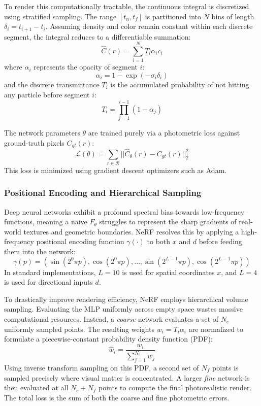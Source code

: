 To render this computationally tractable, the continuous integral is discretized using stratified sampling. The range $[t_n, t_f]$ is partitioned into $N$ bins of length $\delta_i = t_{i+1} - t_i$. Assuming density and color remain constant within each discrete segment, the integral reduces to a differentiable summation:
\begin{equation}
\hat{C}(r) = \sum_{i=1}^N T_i \alpha_i c_i
\end{equation}
where $\alpha_i$ represents the opacity of segment $i$:
\begin{equation}
\alpha_i = 1 - \exp(-\sigma_i \delta_i)
\end{equation}
and the discrete transmittance $T_i$ is the accumulated probability of not hitting any particle before segment $i$:
\begin{equation}
T_i = \prod_{j=1}^{i-1} (1 - \alpha_j)
\end{equation}

The network parameters $\theta$ are trained purely via a photometric loss against ground-truth pixels $C_{gt}(r)$:
\begin{equation}
\mathcal{L}(\theta) = \sum_{r \in \mathcal{R}} ||\hat{C}_\theta(r) - C_{gt}(r)||^2_2
\end{equation}
This loss is minimized using gradient descent optimizers such as Adam.

\subsubsection{Positional Encoding and Hierarchical Sampling}
Deep neural networks exhibit a profound spectral bias towards low-frequency functions, meaning a naive $F_\theta$ struggles to represent the sharp gradients of real-world textures and geometric boundaries. NeRF resolves this by applying a high-frequency positional encoding function $\gamma(\cdot)$ to both $x$ and $d$ before feeding them into the network:
\begin{equation}
\gamma(p) = \left(\sin(2^0 \pi p), \cos(2^0 \pi p), \dots, \sin(2^{L-1} \pi p), \cos(2^{L-1} \pi p)\right)
\end{equation}
In standard implementations, $L=10$ is used for spatial coordinates $x$, and $L=4$ is used for directional inputs $d$.

To drastically improve rendering efficiency, NeRF employs hierarchical volume sampling. Evaluating the MLP uniformly across empty space wastes massive computational resources. Instead, a \textit{coarse} network evaluates a set of $N_c$ uniformly sampled points. The resulting weights $w_i = T_i \alpha_i$ are normalized to formulate a piecewise-constant probability density function (PDF):
\begin{equation}
\hat{w}_i = \frac{w_i}{\sum_{j=1}^{N_c} w_j}
\end{equation}
Using inverse transform sampling on this PDF, a second set of $N_f$ points is sampled precisely where visual matter is concentrated. A larger \textit{fine} network is then evaluated at all $N_c + N_f$ points to compute the final photorealistic render. The total loss is the sum of both the coarse and fine photometric errors.

